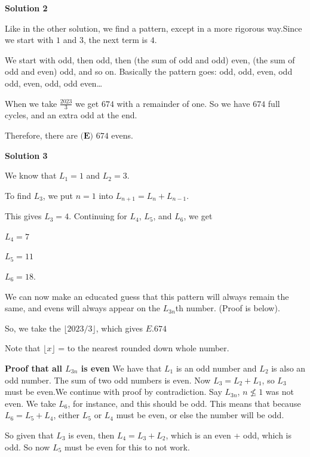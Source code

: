 \begin{enumerate}
 



\textbf{Solution 2}

Like in the other solution, we find a pattern, except in a more rigorous way.Since we start with $1$ and $3$, the next term is $4$.

 We start with odd, then odd, then (the sum of odd and odd) even, (the sum of odd and even) odd, and so on. Basically the pattern goes: odd, odd, even, odd odd, even, odd, odd even\ldots

 When we take $\frac{2023}{3}$ we get $674$ with a remainder of one. So we have $674$ full cycles, and an extra odd at the end. 

 Therefore, there are $\boxed{\textbf{(E) }674}$ evens.

 



\textbf{Solution 3}

We know that \( L_1 = 1 \) and \( L_2 = 3 \).

 To find \( L_3 \), we put \( n=1 \) into \( L_{n+1} = L_n + L_{n-1} \).

 This gives \( L_3 = 4 \). Continuing for \( L_4 \), \( L_5 \), and \( L_6 \), we get

 \( L_4 = 7 \)

 \( L_5 = 11 \)

 \( L_6 = 18 \).

 We can now make an educated guess that this pattern will always remain the same, and evens will always appear on the \( L_{3n} \)th number. (Proof is below).

 So, we take the \( \lfloor 2023/3 \rfloor \), which gives $\boxed{E. 674}$

 Note that \( \lfloor x \rfloor \) = to the nearest rounded down whole number.

 \textbf{Proof that all \( L_{3n} \) is even} We have that \( L_1 \) is an odd number and \( L_2 \) is also an odd number. The sum of two odd numbers is even. Now \( L_3 = L_2 + L_1 \), so \( L_3 \) must be even.We continue with proof by contradiction. Say \( L_{3n} \), \( n \not\le 1 \) was not even. We take \( L_6 \), for instance, and this should be odd. This means that because \( L_6 = L_5 + L_4 \), either \( L_5 \) or \( L_4 \) must be even, or else the number will be odd.

 So given that \( L_3 \) is even, then \( L_4 = L_3 + L_2 \), which is an even + odd, which is odd. So now \( L_5 \) must be even for this to not work. 


\end{enumerate}
